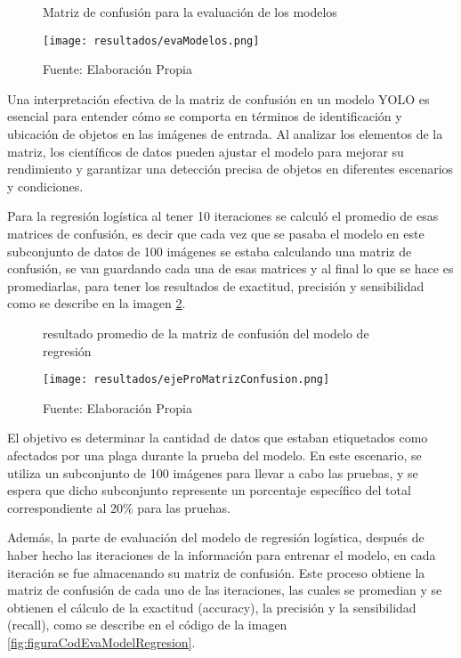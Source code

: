 \newpage

\begin{figure}[h]
\centering
\caption{Matriz de confusión para la evaluación de los modelos}
\texttt{[image: resultados/evaModelos.png]}
\caption*{\footnotesize Fuente: Elaboración Propia}
\label{fig:figuraEvaModelos}
\end{figure}

Una interpretación efectiva de la matriz de confusión en un modelo YOLO es esencial para entender cómo se comporta en términos de identificación y ubicación de objetos en las imágenes de entrada. Al analizar los elementos de la matriz, los científicos de datos pueden ajustar el modelo para mejorar su rendimiento y garantizar una detección precisa de objetos en diferentes escenarios y condiciones.

Para la regresión logística al tener 10 iteraciones se calculó el promedio de esas matrices de confusión, es decir que cada vez que se pasaba el modelo en este subconjunto de datos de 100 imágenes se estaba calculando una matriz de confusión, se van guardando cada una de esas matrices y al final lo que se hace es promediarlas, para tener los resultados de exactitud, precisión y sensibilidad como se describe en la imagen \ref{fig:figuraEjeProMatrizConfusion}.


\newpage

\begin{figure}[h]
\centering
\caption{resultado promedio de la matriz de confusión del modelo de regresión}
\texttt{[image: resultados/ejeProMatrizConfusion.png]}
\caption*{\footnotesize Fuente: Elaboración Propia}
\label{fig:figuraEjeProMatrizConfusion}
\end{figure}

El objetivo es determinar la cantidad de datos que estaban etiquetados como afectados por una plaga durante la prueba del modelo. En este escenario, se utiliza un subconjunto de 100 imágenes para llevar a cabo las pruebas, y se espera que dicho subconjunto represente un porcentaje específico del total correspondiente al 20\% para las pruehas.

Además, la parte de evaluación del modelo de regresión logística, después de haber hecho las iteraciones de la información para entrenar el modelo, en cada iteración se fue almacenando su matriz de confusión. Este proceso obtiene la matriz de confusión de cada uno de las iteraciones, las cuales se promedian y se obtienen el cálculo de la exactitud (accuracy), la precisión y la sensibilidad (recall), como se describe en el código de la imagen \ref{fig:figuraCodEvaModelRegresion}. 

